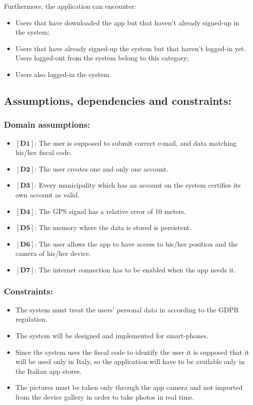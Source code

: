 \documentclass[titlepage]{article}
\begin{document}
Furthermore, the application can encounter:
\begin{itemize}
	\item Users that have downloaded the app but that haven't already signed-up in the system;
	\item Users that have already signed-up the system but that haven't logged-in yet. Users logged-out from the system belong to this category;
	\item Users also logged-in the system.\\
	
\end{itemize}

 



\subsection{Assumptions, dependencies and constraints: }
\subsubsection{Domain assumptions: }
\begin{itemize}
	\item $[\textbf{D1}]$: The user is supposed to submit correct e-mail, and data matching his/her fiscal code.
	\item $[\textbf{D2}]$: The user creates one and only one account.
	\item $[\textbf{D3}]$: Every municipality which has an account on the system certifies its own account as valid.
	\item $[\textbf{D4}]$: The GPS signal has a relative error of 10 meters.
	\item $[\textbf{D5}]$: The memory where the data is stored is persistent.
	\item$[\textbf{D6}]$: The user allows the app to have access to his/her position and the camera of his/her device.
	\item $[\textbf{D7}]$: The internet connection has to be enabled when the app needs it.
	
\end{itemize}
\subsubsection{Constraints: }
\begin{itemize}
	\item  The system must treat the users' personal data in according to the GDPR regulation.
	\item The system will be designed and implemented for smart-phones.
	\item Since the system uses the fiscal code to identify the user it is supposed that it will be used only in Italy, so the application will have to be available only in the Italian app stores.
	\item The pictures must be taken only through the app camera and not imported from the device gallery in order to take photos in real time.
\end{itemize}
\end{document}
